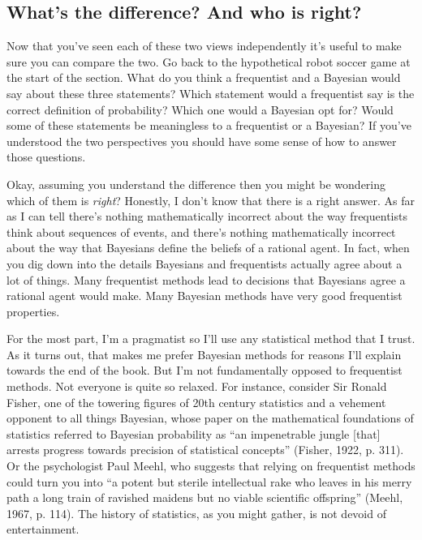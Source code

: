 \documentclass[
  letterpaper,
]{book}
\begin{document}
\hypertarget{whats-the-difference-and-who-is-right}{%
\subsection{What's the difference? And who is
right?}\label{whats-the-difference-and-who-is-right}}

Now that you've seen each of these two views independently it's useful
to make sure you can compare the two. Go back to the hypothetical robot
soccer game at the start of the section. What do you think a frequentist
and a Bayesian would say about these three statements? Which statement
would a frequentist say is the correct definition of probability? Which
one would a Bayesian opt for? Would some of these statements be
meaningless to a frequentist or a Bayesian? If you've understood the two
perspectives you should have some sense of how to answer those
questions.

Okay, assuming you understand the difference then you might be wondering
which of them is \emph{right}? Honestly, I don't know that there is a
right answer. As far as I can tell there's nothing mathematically
incorrect about the way frequentists think about sequences of events,
and there's nothing mathematically incorrect about the way that
Bayesians define the beliefs of a rational agent. In fact, when you dig
down into the details Bayesians and frequentists actually agree about a
lot of things. Many frequentist methods lead to decisions that Bayesians
agree a rational agent would make. Many Bayesian methods have very good
frequentist properties.

For the most part, I'm a pragmatist so I'll use any statistical method
that I trust. As it turns out, that makes me prefer Bayesian methods for
reasons I'll explain towards the end of the book. But I'm not
fundamentally opposed to frequentist methods. Not everyone is quite so
relaxed. For instance, consider Sir Ronald Fisher, one of the towering
figures of 20th century statistics and a vehement opponent to all things
Bayesian, whose paper on the mathematical foundations of statistics
referred to Bayesian probability as ``an impenetrable jungle {[}that{]}
arrests progress towards precision of statistical concepts'' (Fisher,
1922, p. 311). Or the psychologist Paul Meehl, who suggests that relying
on frequentist methods could turn you into ``a potent but sterile
intellectual rake who leaves in his merry path a long train of ravished
maidens but no viable scientific offspring'' (Meehl, 1967, p. 114). The
history of statistics, as you might gather, is not devoid of
entertainment.
\end{document}
